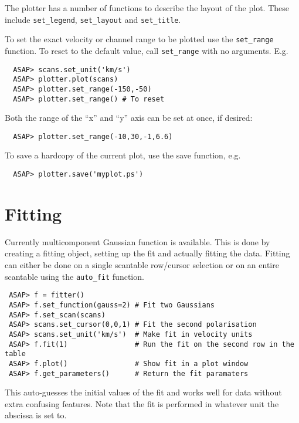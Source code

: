 \documentclass[11pt]{article}
\newcommand{\cmd}[1]{{\tt #1}}
\begin{document}
The plotter has a number of functions to describe the layout of the
plot. These include \cmd{set\_legend}, \cmd{set\_layout} and \cmd{set\_title}.

To set the exact velocity or channel range to be plotted use the
\cmd{set\_range} function. To reset to the default value, call
\cmd{set\_range} with no arguments. E.g.

\begin{verbatim}
  ASAP> scans.set_unit('km/s')
  ASAP> plotter.plot(scans)
  ASAP> plotter.set_range(-150,-50)
  ASAP> plotter.set_range() # To reset
\end{verbatim}

Both the range of the ``x'' and ``y'' axis can be set at once, if desired:

\begin{verbatim}
  ASAP> plotter.set_range(-10,30,-1,6.6)
\end{verbatim}

To save a hardcopy of the current plot, use the save function, e.g. 

\begin{verbatim}
  ASAP> plotter.save('myplot.ps')
\end{verbatim}

\section{Fitting}

Currently multicomponent Gaussian function is available. This is done
by creating a fitting object, setting up the fit and actually fitting
the data. Fitting can either be done on a single scantable row/cursor
selection or on an entire scantable using the \cmd{auto\_fit} function.

\begin{verbatim}
 ASAP> f = fitter()
 ASAP> f.set_function(gauss=2) # Fit two Gaussians
 ASAP> f.set_scan(scans)
 ASAP> scans.set_cursor(0,0,1) # Fit the second polarisation
 ASAP> scans.set_unit('km/s')  # Make fit in velocity units
 ASAP> f.fit(1)                # Run the fit on the second row in the table
 ASAP> f.plot()                # Show fit in a plot window
 ASAP> f.get_parameters()      # Return the fit paramaters
\end{verbatim}

This auto-guesses the initial values of the fit and works well for data
without extra confusing features. Note that the fit is performed in
whatever unit the abscissa is set to.
\end{document}
